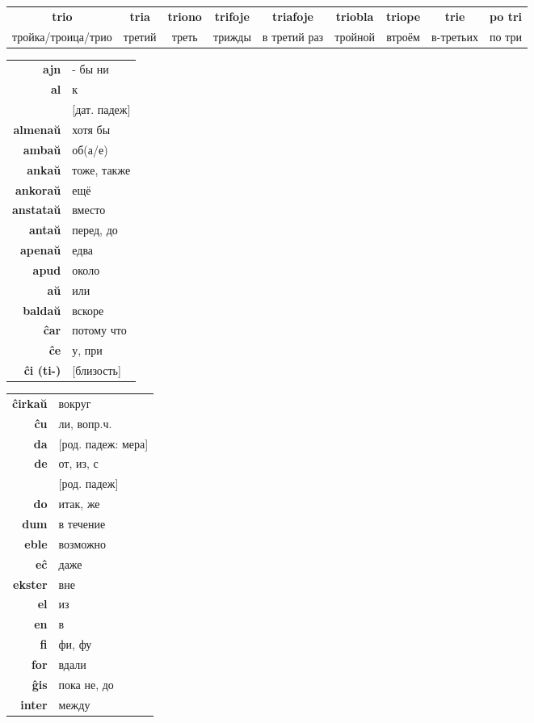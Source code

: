 \documentclass{article}
\def\b#1{\textbf{#1}}
\begin{document}
\begin{tabular}{|c|c|c|c|c|c|c|c|c|}
\hline
\b{trio} & \b{tria} & \b{triono} & \b{trifoje} & \b{triafoje} & \b{triobla} & \b{triope} & \b{trie} & \b{po tri} \\
тройка/троица/трио & третий & треть & трижды & в третий раз & тройной & втроём  & в-третьих & по три \\ 
\hline
\end{tabular}

\vspace{1em}
\begin{tabular}{|>{\bfseries}rl}
\hline
ajn & - бы ни \\
al & к \\
~ & {}[дат. падеж] \\
almenaŭ & хотя бы \\
ambaŭ & об(а/е) \\
ankaŭ & тоже, также \\
ankoraŭ & ещё \\
anstataŭ & вместо \\
antaŭ & перед, до \\
apenaŭ & едва \\
apud & около \\
aŭ & или \\
baldaŭ & вскоре \\
ĉar & потому что \\
ĉe & у, при \\
ĉi (ti-) & {}[близость] \\
\hline
\end{tabular}
\hspace{-1em}
\begin{tabular}{>{\bfseries}rl}
\hline
ĉirkaŭ & вокруг \\
ĉu & ли, вопр.ч. \\
da & {}[род. падеж: мера] \\
de & от, из, с \\
~ & {}[род. падеж] \\
do & итак, же \\
dum & в течение \\
eble & возможно \\
eĉ & даже \\
ekster & вне \\
el & из \\
en & в \\
fi & фи, фу \\
for & вдали \\
ĝis & пока не, до \\
inter & между \\
\hline
\end{tabular}
\end{document}
